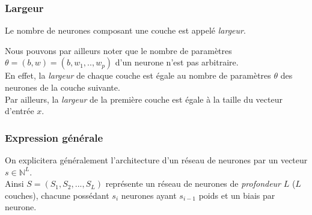 \documentclass[10pt,a4paper]{report}
\begin{document}
		\subsubsection{Largeur}
		\begin{center}
			Le nombre de neurones composant une couche est appelé \emph{largeur}.\\
		\end{center}
		Nous pouvons par ailleurs noter que le nombre de paramètres $\theta = (b,w) = (b,w_1,..,w_p)$ d'un neurone n'est pas arbitraire.\\
		En effet, la \emph{largeur} de chaque couche est égale au nombre de paramètres $\theta$ des neurones de la couche suivante.\\
		Par ailleurs, la \emph{largeur} de la première couche est égale à la taille du vecteur d'entrée $x$.\\
		\subsubsection{Expression générale}
		On explicitera généralement l'architecture d'un réseau de neurones par un vecteur $s \in \mathbb{N}^L$.\\
		Ainsi $S = (S_1, S_2, ..., S_L)$ représente un réseau de neurones de \emph{profondeur} $L$ ($L$ couches), chacune possédant $s_i$ neurones ayant $s_{i-1}$ poids et un biais par neurone.
\end{document}
